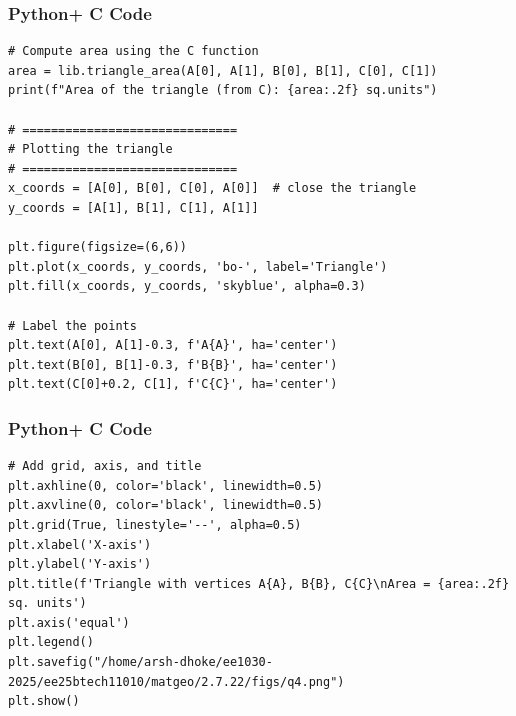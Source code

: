 \documentclass{beamer}
\begin{document}
\begin{frame}[fragile]
    \frametitle{Python+ C Code}
\begin{lstlisting}
# Compute area using the C function
area = lib.triangle_area(A[0], A[1], B[0], B[1], C[0], C[1])
print(f"Area of the triangle (from C): {area:.2f} sq.units")

# ==============================
# Plotting the triangle
# ==============================
x_coords = [A[0], B[0], C[0], A[0]]  # close the triangle
y_coords = [A[1], B[1], C[1], A[1]]

plt.figure(figsize=(6,6))
plt.plot(x_coords, y_coords, 'bo-', label='Triangle')
plt.fill(x_coords, y_coords, 'skyblue', alpha=0.3)

# Label the points
plt.text(A[0], A[1]-0.3, f'A{A}', ha='center')
plt.text(B[0], B[1]-0.3, f'B{B}', ha='center')
plt.text(C[0]+0.2, C[1], f'C{C}', ha='center')
\end{lstlisting}
\end{frame}

\begin{frame}[fragile]
    \frametitle{Python+ C Code}
\begin{lstlisting}
# Add grid, axis, and title
plt.axhline(0, color='black', linewidth=0.5)
plt.axvline(0, color='black', linewidth=0.5)
plt.grid(True, linestyle='--', alpha=0.5)
plt.xlabel('X-axis')
plt.ylabel('Y-axis')
plt.title(f'Triangle with vertices A{A}, B{B}, C{C}\nArea = {area:.2f} sq. units')
plt.axis('equal')
plt.legend()
plt.savefig("/home/arsh-dhoke/ee1030-2025/ee25btech11010/matgeo/2.7.22/figs/q4.png")
plt.show()
\end{lstlisting}
\end{frame}
\end{document}
